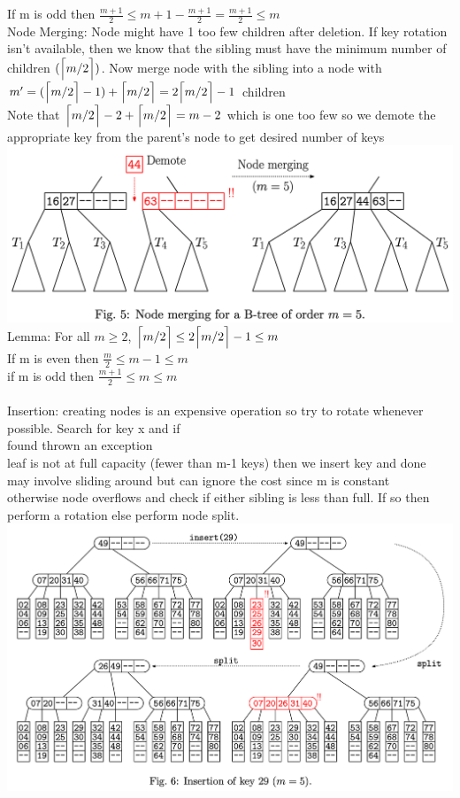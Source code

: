 \documentclass{article}
\DeclarePairedDelimiter{\ceil}{\lceil}{\rceil}
\begin{document}
  If m is odd then $\frac{m+1}{2} \leq m + 1 - \frac{m+1}{2} = \frac{m+1}{2} \leq m$\\
  Node Merging: Node might have 1 too few children after deletion. If key rotation isn't available, then we know that the sibling must have the minimum number of children $(\ceil[\Big]{m/2})$. Now merge node with the sibling into a node with $m' = (\ceil[\Big]{m/2} - 1) + \ceil[\Big]{m/2} = 2\ceil[\Big]{m/2} - 1$ children\\
  Note that $\ceil[\Big]{m/2} - 2 + \ceil[\Big]{m/2} = m - 2$ which is one too few so we demote the appropriate key from the parent's node to get desired number of keys\\
  \includegraphics[width=\textwidth]{BtreeNodeMerge}
  Lemma: For all $m \geq 2$, $\ceil[\Big]{m/2} \leq 2\ceil[\Big]{m/2} - 1 \leq m$\\
  If m is even then $\frac{m}{2} \leq m - 1 \leq m$\\
  if m is odd then $\frac{m+1}{2} \leq m \leq m$\\ \\
  Insertion: creating nodes is an expensive operation so try to rotate whenever possible. Search for key x and if\\
  \indent found thrown an exception\\
  \indent leaf is not at full capacity (fewer than m-1 keys) then we insert key and done\\
  \indent \indent may involve sliding around but can ignore the cost since m is constant\\
  \indent otherwise node overflows and check if either sibling is less than full. If so then perform a rotation else perform node split. \\
  \includegraphics[width=\textwidth]{BTreeInsertion}
\end{document}
